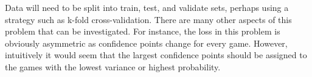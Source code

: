 \documentclass[12pt]{report}
\begin{document}
Data will need to be split into train, test, and validate sets, perhaps using a strategy such as k-fold cross-validation. There are many other aspects of this problem that can be investigated. For instance, the loss in this problem is obviously asymmetric as confidence points change for every game. However, intuitively it would seem that the largest confidence points should be assigned to the games with the lowest variance or highest probability.
\end{document}
